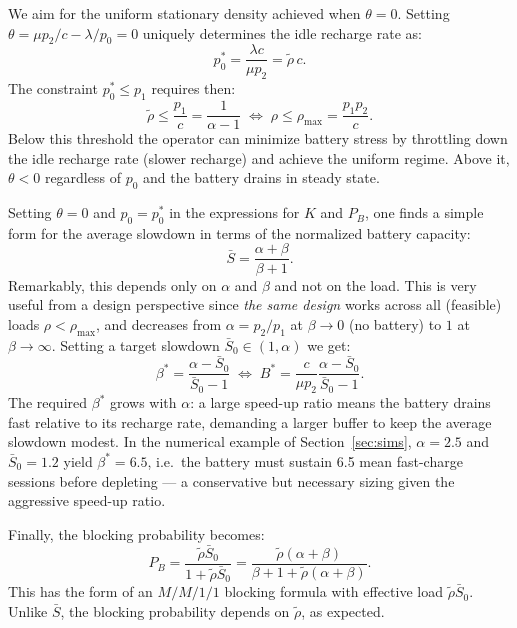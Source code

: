 \documentclass{sig-alternate-per-modified}
\begin{document}
We aim for the uniform stationary density achieved when $\theta=0$. Setting $\theta = \mu p_2/c - \lambda/p_0=0$ uniquely determines the idle recharge rate as:
\begin{equation}
  p_0^* = \frac{\lambda c}{\mu p_2} = \tilde\rho\, c.
  \label{eq:p0star}
\end{equation}
The constraint $p_0^* \leqslant p_1$ requires then:
\begin{equation}
  \tilde\rho \leqslant \frac{p_1}{c} = \frac{1}{\alpha - 1} \; \Longleftrightarrow \; \rho \leqslant \rho_{\max} = \frac{p_1 p_2}{c}.
  \label{eq:rhomax}
\end{equation}
Below this threshold the operator can minimize battery stress by throttling down the idle recharge rate (slower recharge) and achieve the uniform regime. Above it, $\theta < 0$ regardless of $p_0$ and the battery drains in steady state.

Setting $\theta=0$ and $p_0 = p_0^*$ in the expressions for $K$ and $P_B$, one finds a simple form for the average slowdown in terms of the normalized battery capacity:
\begin{equation}
  \bar{S} = \frac{\alpha + \beta}{\beta + 1}.
  \label{eq:Sbar_beta}
\end{equation}
Remarkably, this depends only on $\alpha$ and $\beta$ and not on the load. This is very useful from a design perspective since \emph{the same design} works across all (feasible) loads $\rho<\rho_{\max}$, and decreases from $\alpha=p_2/p_1$ at $\beta\to 0$ (no battery) to $1$ at $\beta\to\infty$. Setting a target slowdown $\bar{S}_0 \in (1,\alpha)$ we get:
\begin{equation}
  \beta^* = \frac{\alpha - \bar{S}_0}{\bar{S}_0 - 1} \; \Longleftrightarrow \; B^* = \frac{c}{\mu p_2}\frac{\alpha - \bar{S}_0}{\bar{S}_0 - 1}.
  \label{eq:Bstar}
\end{equation}
The required $\beta^*$ grows with $\alpha$: a large speed-up ratio means the battery
drains fast relative to its recharge rate, demanding a larger buffer to keep the
average slowdown modest. In the numerical example of Section~\ref{sec:sims},
$\alpha=2.5$ and $\bar{S}_0=1.2$ yield $\beta^*=6.5$, i.e.\ the battery must sustain
6.5 mean fast-charge sessions before depleting --- a conservative but necessary sizing
given the aggressive speed-up ratio.

Finally, the blocking probability becomes:
\begin{equation}
  P_B = \frac{\tilde\rho\bar{S}_0}{1+\tilde\rho\bar{S}_0} = \frac{\tilde\rho(\alpha + \beta)}{\beta + 1 + \tilde\rho(\alpha + \beta)}.
  \label{eq:PB_opt}
\end{equation}
This has the form of an $M/M/1/1$ blocking formula with effective load
$\tilde\rho\bar{S}_0$. Unlike $\bar{S}$, the blocking probability depends on $\tilde\rho$, as expected.
\end{document}
